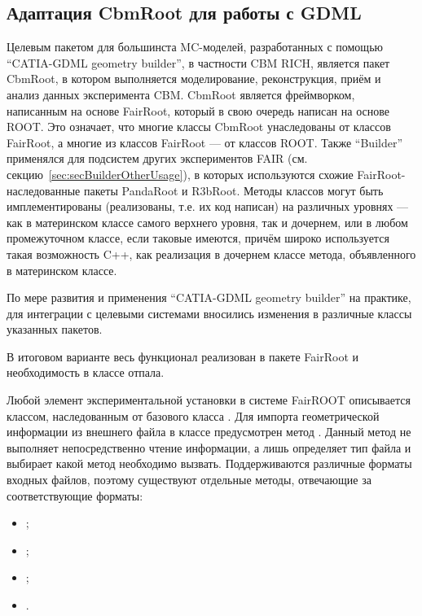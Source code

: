 \subsection{Адаптация CbmRoot для работы с GDML}\label{sec:secFairModule}

Целевым пакетом для большинста MC-моделей, разработанных с помощью ``CATIA-GDML geometry builder'', в частности CBM RICH, является пакет CbmRoot, в котором выполняется моделирование, реконструкция, приём и анализ данных эксперимента CBM.
CbmRoot является фреймворком, написанным на основе FairRoot, который в свою очередь написан на основе ROOT.
Это означает, что многие классы CbmRoot унаследованы от классов FairRoot, а многие из классов FairRoot --- от классов ROOT.
Также ``Builder'' применялся для подсистем других экспериментов FAIR (см. секцию~\ref{sec:secBuilderOtherUsage}), в которых используются схожие FairRoot-наследованные пакеты PandaRoot и R3bRoot.
Методы классов могут быть имплементированы (реализованы, т.е. их код написан) на различных уровнях --- как в материнском классе самого верхнего уровня, так и дочернем, или в любом промежуточном классе, если таковые имеются, причём широко используется такая возможность C++, как реализация в дочернем классе метода, объявленного в материнском классе.

По мере развития и применения ``CATIA-GDML geometry builder'' на практике, для интеграции с целевыми системами вносились изменения в различные классы указанных пакетов.

В итоговом варианте весь функционал реализован в пакете FairRoot и необходимость в классе  отпала.

Любой элемент экспериментальной установки в системе FairROOT описывается классом, наследованным от базового класса .
Для импорта геометрической информации из внешнего файла в классе  предусмотрен метод .
Данный метод не выполняет непосредственно чтение информации, а лишь определяет тип файла и выбирает какой метод необходимо вызвать.
Поддерживаются различные форматы входных файлов, поэтому существуют отдельные методы, отвечающие за соответствующие форматы:

\begin{itemize}
\itemsep0pt
\item {};
\item {};
\item {};
\item {}.
\end{itemize}

